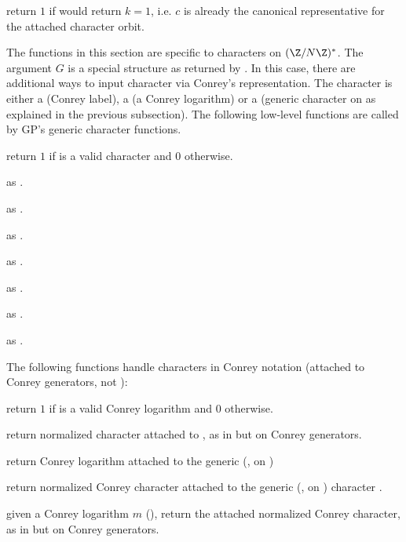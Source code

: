  return $1$ if
 would return $k = 1$, i.e. $c$ is already the canonical
representative for the attached character orbit.


The functions in this section are  specific to characters on $(\Z/N\Z)^*$.
The argument $G$ is a special  structure as returned by
. In this case, there are additional ways
to input character via Conrey's representation. The character  is
either a  (Conrey label), a  (a Conrey logarithm) or a
 (generic character on  as explained in the previous
subsection). The following low-level functions are called by GP's generic
character functions.

 return $1$ if  is
a valid character and $0$ otherwise.

 as .

 as .

 as .

 as .

 as .

 as .

 as .

The following functions handle characters in Conrey notation (attached to
Conrey generators, not ):

 return $1$ if  is
a valid Conrey logarithm and $0$ otherwise.

 return normalized character
attached to , as in  but on Conrey generators.

 return Conrey logarithm
attached to the generic (, on )

 return normalized
Conrey character attached to the generic (, on )
character .

 given a Conrey logarithm $m$
(), return the attached normalized Conrey character, as in
 but on Conrey generators.

